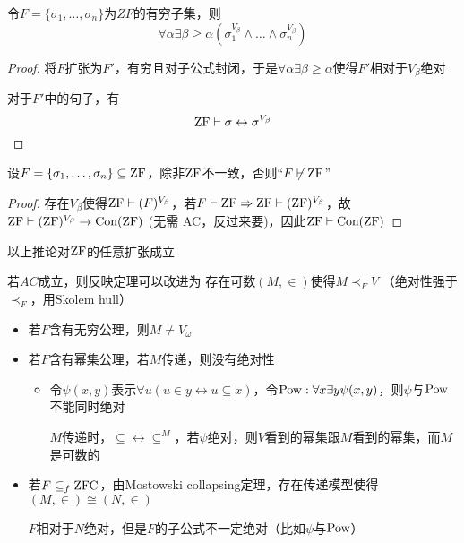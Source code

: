 \documentclass[11pt]{article}
\begin{document}
\begin{corollary}[ZF]
令\(F=\{\sigma_1,\dots,\sigma_n\}\)为\(ZF\)的有穷子集，则
\begin{equation*}
\forall\alpha\exists\beta\ge\alpha(\sigma_1^{V_\beta}\wedge\dots\wedge\sigma_n^{V_\beta})
\end{equation*}
\end{corollary}

\begin{proof}
将\(F\)扩张为\(F'\)，有穷且对子公式封闭，于是\(\forall\alpha\exists\beta\ge\alpha\)使得\(F'\)相对于\(V_\beta\)绝对

对于\(F'\)中的句子，有
\begin{equation*}
\operatorname{ZF}\vdash\sigma\leftrightarrow\sigma^{V_\beta}
\end{equation*}
\end{proof}

\begin{corollary}[]
设\(F=\{\sigma_1,\dots,\sigma_n\}\subseteq\operatorname{ZF}\)，除非\(\operatorname{ZF}\)不一致，否则``\(F\not\vdash\operatorname{ZF}\)''
\end{corollary}

\begin{proof}
存在\(V_\beta\)使得\(\operatorname{ZF}\vdash(F)^{V_\beta}\)，若\(F\vdash\operatorname{ZF}\Rightarrow\operatorname{ZF}\vdash(\operatorname{ZF})^{V_\beta}\)，故\(\operatorname{ZF}\vdash(\operatorname{ZF})^{V_\beta}\to\text{Con}(\operatorname{ZF})\) (无需
AC，反过来要)，因此\(\operatorname{ZF}\vdash\text{Con}(\operatorname{ZF})\)
\end{proof}

\begin{remark}
以上推论对\(\operatorname{ZF}\)的任意扩张成立

若\(AC\)成立，则反映定理可以改进为
存在可数\((M,\in)\)使得\(M\prec_FV\) （绝对性强于\(\prec_F\)，用Skolem hull）
\begin{itemize}
\item 若\(F\)含有无穷公理，则\(M\neq V_\omega\)
\item 若\(F\)含有幂集公理，若\(M\)传递，则没有绝对性
\begin{itemize}
\item 令\(\psi(x,y)\)表示\(\forall u(u\in y\leftrightarrow u\subseteq x)\)，令\(\operatorname{Pow}:\forall x\exists y\psi(x,y)\)，则\(\psi\)与\(\operatorname{Pow}\)不能同时绝对

\(M\)传递时，\(\subseteq\leftrightarrow\subseteq^{M}\)，若\(\psi\)绝对，则\(V\)看到的幂集跟\(M\)看到的幂集，而\(M\)是可数的
\end{itemize}

\item 若\(F\subseteq_f\operatorname{ZFC}\)，由Mostowski collapsing定理，存在传递模型使得\((M,\in)\cong(N,\in)\)

\(F\)相对于\(N\)绝对，但是\(F\)的子公式不一定绝对（比如\(\psi\)与\(\operatorname{Pow}\)）
\end{itemize}
\end{remark}
\end{document}
